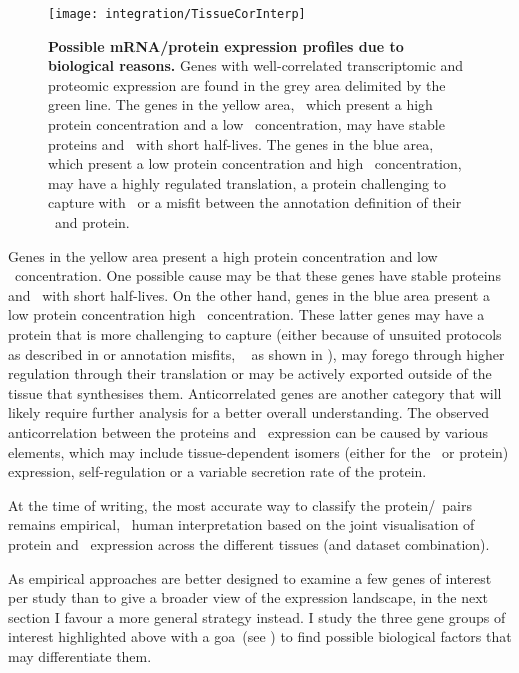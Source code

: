 \begin{figure}[!htb]
    \texttt{[image: integration/TissueCorInterp]}\centering
    \vspace{-3mm}
    \caption[Possible mRNA/protein expression profiles
    due to biological reasons.]{\label{fig:CorImprovable}%
    \textbf{Possible mRNA/protein expression profiles due to biological reasons.}
    Genes with well-correlated transcriptomic and proteomic expression
    are found in the grey area delimited by the green line.
    The genes in the yellow area,
    \ie\ which present a high protein concentration and a low \mRNA\ concentration,
    may have stable proteins and \mRNAs\ with short half-lives.
    The genes in the blue area,
    which present a low protein concentration and high \mRNA\ concentration,
    may have a highly regulated translation,
    a protein challenging to capture with \ms\,
    or a misfit between the annotation definition of their \mRNA\ and protein.
    }
\end{figure}

Genes in the yellow area present a high protein concentration
and low \mRNA\ concentration.
One possible cause may be that these genes have stable proteins
and \mRNAs\ with short half-lives.
On the other hand,
genes in the blue area present a low protein concentration
high \mRNA\ concentration.
These latter genes may have a protein that is more challenging to capture
(either because of unsuited protocols as described in 
or annotation misfits, \eg\  as shown in ),
may forego through higher regulation through their translation
or may be actively exported outside of the tissue that synthesises them.
Anticorrelated genes are another category that will likely require
further analysis for a better overall understanding.
The observed anticorrelation between the proteins and \mRNAs\ expression
can be caused by various elements, which may include
tissue-dependent isomers (either for the \mRNA\ or protein) expression,
self-regulation or a variable secretion rate of the protein.\mybr\

At the time of writing,
the most accurate way to classify the protein/\mRNA\ pairs
remains empirical,
\ie\ human interpretation based on
the joint visualisation of protein and \mRNA\ expression
across the different tissues (and dataset combination).\mybr\

As empirical approaches are better designed
to examine a few genes of interest per study
than to give a broader view of the expression landscape,
in the next section I favour a more general strategy instead.
I study the three gene groups of interest highlighted above
with a \glsdesc{goa}~(see )
to find possible biological factors that may differentiate them.\mybr\

